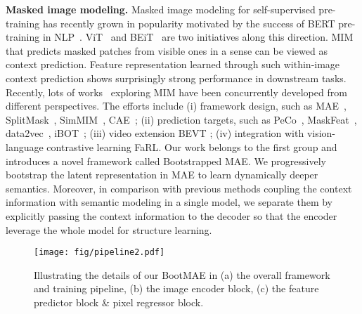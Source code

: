 \documentclass[runningheads]{llncs}
\begin{document}
\noindent \textbf{Masked image modeling.}
Masked image modeling for self-supervised pre-training has recently grown in popularity motivated by the success of BERT pre-training in NLP~\cite{devlin2018bert}. ViT~\cite{dosovitskiy2020image} and BEiT~\cite{bao2021beit} are two initiatives along this direction.
MIM that predicts masked patches from visible ones in a sense can be viewed as context prediction.
Feature representation learned through such within-image context prediction shows surprisingly strong performance in downstream tasks. 
Recently, lots of works~\cite{he2021masked,fang2022corrupted} exploring MIM have been concurrently developed from different perspectives.
The efforts include (i) framework design, such as MAE~\cite{he2021masked}, SplitMask~\cite{el2021large}, SimMIM~\cite{xie2021simmim}, CAE~\cite{chen2022context};
(ii) prediction targets, such as PeCo~\cite{dong2021peco}, MaskFeat~\cite{wei2021masked}, data2vec~\cite{baevski2022data2vec}, iBOT~\cite{zhou2021ibot}; (iii) video extension BEVT \cite{wang2022bevt}; (iv) integration with vision-language contrastive learning FaRL\cite{zheng2022general}.
Our work belongs to the first group and introduces a novel framework called Bootstrapped MAE.
We progressively bootstrap the latent representation in MAE to learn dynamically deeper semantics. Moreover, in comparison with previous methods coupling the context information with semantic modeling in a single model, we separate them by explicitly passing the context information to the decoder so that the encoder leverage the whole model for structure learning. 

\begin{figure}[t]\centering
\texttt{[image: fig/pipeline2.pdf]}\vspace{-.7em}
\caption{Illustrating the details of our BootMAE in (a) the overall framework and training pipeline, (b) the image encoder block, (c) the feature predictor block \& pixel regressor block.}
\label{fig:pipeline}
\vspace{-4mm}
\end{figure}

\vspace{-1mm}
\end{document}
